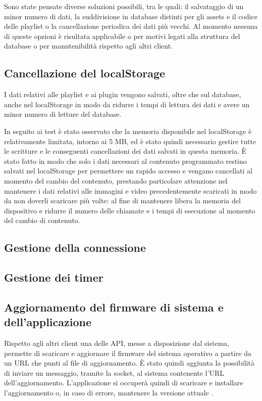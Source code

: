 Sono state pensate diverse soluzioni possibili, tra le quali: il salvataggio di un minor numero di dati, la suddivisione in database distinti per gli assets e il codice delle playlist o la cancellazione periodica dei dati più vecchi. Al momento nessuna di queste opzioni è risultata applicabile o per motivi legati alla struttura del database o per manutenibilità rispetto agli altri client.

\subsection{Cancellazione del localStorage} \label{freestorage}

I dati relativi alle playlist e ai plugin vengono salvati, oltre che sul database, anche nel localStorage in modo da ridurre i tempi di lettura dei dati e avere un minor numero di letture del database. 

In seguito ai test è stato osservato che la memoria disponibile nel localStorage è relativamente limitata, intorno ai 5 MB, ed è stato quindi necessario gestire tutte le scritture e le conseguenti cancellazioni dei dati salvati in questa memoria. È stato fatto in modo che solo i dati necessari al contenuto programmato restino salvati nel localStorage per permettere un rapido accesso e vengano cancellati al momento del cambio del contenuto, prestando particolare attenzione nel mantenere i dati relativi alle immagini e video precedentemente scaricati in modo da non doverli scaricare più volte: al fine di mantenere libera la memoria del dispositivo e ridurre il numero delle chiamate e i tempi di esecuzione al momento del cambio di contenuto.

\subsection{Gestione della connessione}
\subsection{Gestione dei timer}
\subsection{Aggiornamento del firmware di sistema e dell'applicazione}\label{update}

Rispetto agli altri client una delle API, messe a disposizione dal sistema, permette di scaricare e aggiornare il firmware del sistema operativo a partire da un URL che punti al file di aggiornamento.
È stato quindi aggiunta la possibilità di inviare un messaggio, tramite la socket, al sistema contenente l'URL dell'aggiornamento. L'applicazione si occuperà quindi di scaricare e installare l'aggiornamento o, in caso di errore, mantenere la versione attuale .

